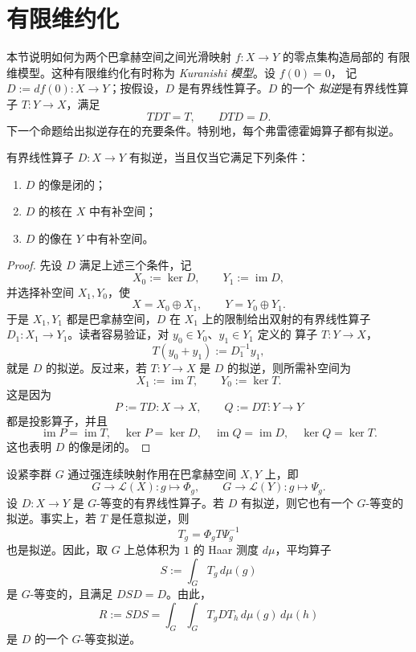 
\section{有限维约化}\label{sec:A-4}

本节说明如何为两个巴拿赫空间之间光滑映射 $f:X\to Y$ 的零点集构造局部的
有限维模型。这种有限维约化有时称为 \emph{Kuranishi 模型}。设 $f(0)=0$，
记 $D:=df(0):X\to Y$；按假设，$D$ 是有界线性算子。$D$ 的一个
\emph{拟逆}是有界线性算子 $T:Y\to X$，满足
\[
  TDT=T,\qquad DTD=D.
\]
下一个命题给出拟逆存在的充要条件。特别地，每个弗雷德霍姆算子都有拟逆。

\begin{proposition}\label{prop:A-4-1}
有界线性算子 $D:X\to Y$ 有拟逆，当且仅当它满足下列条件：
\begin{enumerate}[label=(\roman*)]
\item $D$ 的像是闭的；
\item $D$ 的核在 $X$ 中有补空间；
\item $D$ 的像在 $Y$ 中有补空间。
\end{enumerate}
\end{proposition}

\begin{proof}
先设 $D$ 满足上述三个条件，记
\[
  X_0:=\ker D,\qquad Y_1:=\operatorname{im}D,
\]
并选择补空间 $X_1,Y_0$，使
\[
  X=X_0\oplus X_1,\qquad Y=Y_0\oplus Y_1.
\]
于是 $X_1,Y_1$ 都是巴拿赫空间，$D$ 在 $X_1$ 上的限制给出双射的有界线性算子
$D_1:X_1\to Y_1$。读者容易验证，对 $y_0\in Y_0$、$y_1\in Y_1$ 定义的
算子 $T:Y\to X$，
\[
  T(y_0+y_1):=D_1^{-1}y_1,
\]
就是 $D$ 的拟逆。反过来，若 $T:Y\to X$ 是 $D$ 的拟逆，则所需补空间为
\[
  X_1:=\operatorname{im}T,\qquad Y_0:=\ker T.
\]
这是因为
\[
  P:=TD:X\to X,\qquad Q:=DT:Y\to Y
\]
都是投影算子，并且
\[
  \operatorname{im}P=\operatorname{im}T,\quad
  \ker P=\ker D,\quad
  \operatorname{im}Q=\operatorname{im}D,\quad
  \ker Q=\ker T.
\]
这也表明 $D$ 的像是闭的。
\end{proof}

\begin{remark}\label{rem:A-4-2}
设紧李群 $G$ 通过强连续映射作用在巴拿赫空间 $X,Y$ 上，即
\[
  G\to\mathcal L(X):g\mapsto\Phi_g,\qquad
  G\to\mathcal L(Y):g\mapsto\Psi_g.
\]
设 $D:X\to Y$ 是 $G$-等变的有界线性算子。若 $D$ 有拟逆，则它也有一个
$G$-等变的拟逆。事实上，若 $T$ 是任意拟逆，则
\[
  T_g=\Phi_gT\Psi_g^{-1}
\]
也是拟逆。因此，取 $G$ 上总体积为 $1$ 的 Haar 测度 $d\mu$，平均算子
\[
  S:=\int_G T_g\,d\mu(g)
\]
是 $G$-等变的，且满足 $DSD=D$。由此，
\[
  R:=SDS=\int_G\int_G T_gDT_h\,d\mu(g)\,d\mu(h)
\]
是 $D$ 的一个 $G$-等变拟逆。
\end{remark}

